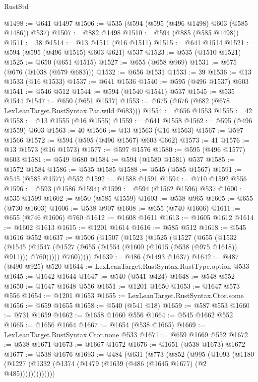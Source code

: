\begin{lexlean}{RustStd}
\begin{coremodule}
@1498 := @641 @1497
@1506 := @535 (@594 (@595 (@496 @1498) @603 (@585 @1486)) @537)
@1507 := @882 @1498
@1510 := @594 (@885 (@585 @1498))
@1511 := 38
@1514 := @13 @1511 (@16 @1511)
@1515 := @641 @1514
@1521 := @594 (@595 (@496 @1515) @603 @621) @537
@1523 := @535 (@1510 @1521)
@1525 := @650 (@651 @1515)
@1527 := @655 (@658 @969)
@1531 := @675 (@676 (@1038 (@679 @683)))
@1532 := @656 @1531
@1533 := 39
@1536 := @13 @1533 (@16 @1533)
@1537 := @641 @1536
@1540 := @595 (@496 @1537) @603
@1541 := @546 @512
@1544 := @594 (@1540 @1541) @537
@1545 := @535 @1544
@1547 := @650 (@651 @1537)
@1553 := @675 (@676 (@682 (@678 LexLeanTarget.RustSyntax.Pat.wild @683)))
@1554 := @656 @1553
@1555 := 42
@1558 := @13 @1555 (@16 @1555)
@1559 := @641 @1558
@1562 := @595 (@496 @1559) @603
@1563 := 40
@1566 := @13 @1563 (@16 @1563)
@1567 := @597 @1566
@1572 := @594 (@595 (@496 @1567) @603 @662)
@1573 := 41
@1576 := @13 @1573 (@16 @1573)
@1577 := @597 @1576
@1580 := @595 (@496 @1577) @603
@1581 := @549 @680
@1584 := @594 (@1580 @1581) @537
@1585 := @1572 @1584
@1586 := @535 @1585
@1588 := @545 (@585 @1567)
@1591 := @545 (@585 @1577) @552
@1592 := @1588 @1591
@1594 := @710 @1592 @556
@1596 := @593 (@1586 @1594)
@1599 := @594 (@1562 @1596) @537
@1600 := @535 @1599
@1602 := @650 (@585 @1559)
@1603 := @538 @965
@1605 := @655 (@730 @1603)
@1606 := @538 @907
@1608 := @655 (@740 @1606)
@1611 := @655 (@746 @1606) @760
@1612 := @1608 @1611
@1613 := @1605 @1612
@1614 := @1602 @1613
@1615 := @1201 @1614
@1616 := @585 @512
@1618 := @545 @1616 @552
@1637 := @1506
    (@1507
      (@1523
        (@1525
          (@1527
            (@655
              (@1532
                (@1545
                  (@1547 (@1527 (@655 (@1554 (@1600 (@1615 (@538 (@975 @1618)) @911))) @760)))))
              @760)))))
@1639 := @486 (@1493 @1637)
@1642 := @487 (@490 @925) @520
@1644 := LexLeanTarget.RustSyntax.RustType.option @533
@1645 := @1642 @1644
@1647 := @540 (@541 @424)
@1648 := @548 @552
@1650 := @1647 @1648 @556
@1651 := @1201 @1650
@1653 := @1647 @573 @556
@1654 := @1201 @1653
@1655 := LexLeanTarget.RustSyntax.Ctor.some
@1656 := @659 @1655
@1658 := @540 (@541 @18)
@1659 := @587 @553
@1660 := @731 @1659
@1662 := @1658 @1660 @556
@1664 := @545 @1662 @552
@1665 := @1656 @1664
@1667 := @1654 (@538 @1665)
@1669 := LexLeanTarget.RustSyntax.Ctor.none @533
@1671 := @659 @1669 @552
@1672 := @538 @1671
@1673 := @1667 @1672
@1676 := @1651 (@538 @1673) @1672
@1677 := @538 @1676
@1693 := @484
    (@631
      (@773
        (@852
          (@995
            (@1093
              (@1180 (@1227 (@1332 (@1374 (@1479 (@1639 (@486 (@1645 @1677) (@2 @485)))))))))))))

\end{coremodule}
\end{lexlean}
